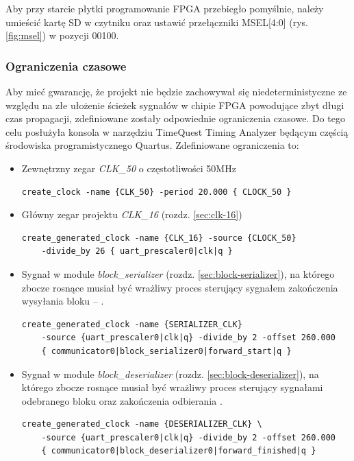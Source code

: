 Aby przy starcie płytki programowanie FPGA przebiegło pomyślnie, należy umieścić kartę SD w czytniku oraz ustawić przełączniki MSEL[4:0] (rys. \ref{fig:msel}) w pozycji 00100.

\subsubsection{Ograniczenia czasowe}
Aby mieć gwarancję, że projekt nie będzie zachowywał się niedeterministyczne ze względu na złe ułożenie ścieżek sygnałów w chipie FPGA powodujące zbyt długi czas propagacji, zdefiniowane zostały odpowiednie ograniczenia czasowe. Do tego celu posłużyła konsola w narzędziu TimeQuest Timing Analyzer będącym częścią środowiska programistycznego Quartus. Zdefiniowane ograniczenia to:

\begin{itemize}
\item Zewnętrzny zegar \textit{CLK\_50} o częstotliwości 50MHz
\begin{lstlisting}[basicstyle=\footnotesize]
create_clock -name {CLK_50} -period 20.000 { CLOCK_50 }
\end{lstlisting}

\item Główny zegar projektu \textit{CLK\_16} (rozdz. \ref{sec:clk-16})
\begin{lstlisting}[basicstyle=\footnotesize]
create_generated_clock -name {CLK_16} -source {CLOCK_50} 
	-divide_by 26 { uart_prescaler0|clk|q }
\end{lstlisting}

\item Sygnał w module \textit{block\_serializer} (rozdz. \ref{sec:block-serializer}), na którego zbocze rosnące musiał być wrażliwy proces sterujący sygnałem zakończenia wysyłania bloku -- .
\begin{lstlisting}[basicstyle=\footnotesize]
create_generated_clock -name {SERIALIZER_CLK} 
	-source {uart_prescaler0|clk|q} -divide_by 2 -offset 260.000 
	{ communicator0|block_serializer0|forward_start|q }
\end{lstlisting}

\item Sygnał w module \textit{block\_deserializer} (rozdz. \ref{sec:block-deserializer}), na którego zbocze rosnące musiał być wrażliwy proces sterujący sygnałami odebranego bloku  oraz zakończenia odbierania .
\begin{lstlisting}[basicstyle=\footnotesize]
create_generated_clock -name {DESERIALIZER_CLK} \
	-source {uart_prescaler0|clk|q} -divide_by 2 -offset 260.000 
	{ communicator0|block_deserializer0|forward_finished|q }
\end{lstlisting}

\end{itemize}

